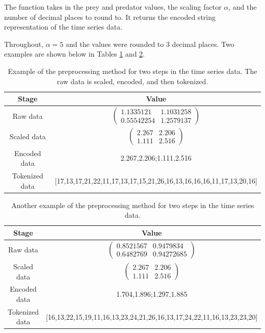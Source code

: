\documentclass[11pt,a4paper]{article}
\begin{document}
\begin{listing}[h]
\inputminted[firstline=64, lastline=83]{python}{../src/preprocessor.py}
\caption{The function takes in the prey and predator values, the scaling factor $\alpha$, and the number of decimal places to round to. It returns the encoded string representation of the time series data.}
\label{lst:preprocess}
\end{listing}

Throughout, $\alpha=5$ and the values were rounded to 3 decimal places. Two examples are shown below in Tables \ref{tab:example} and \ref{tab:example2}.

\begin{table}
    \centering
    \begin{tabular}{c|c}
        Stage & Value \\
        \hline
        Raw data & $\begin{pmatrix} 1.1335121  & 1.1031258 \\ 0.55542254  & 1.2579137 \end{pmatrix}$ \\
        Scaled data & $\begin{pmatrix} 2.267 & 2.206 \\ 1.111 & 2.516 \end{pmatrix}$ \\
        Encoded data & 2.267,2.206;1.111,2.516 \\
        Tokenized data & [17,13,17,21,22,11,17,13,17,15,21,26,16,13,16,16,16,11,17,13,20,16]
    \end{tabular}
    \caption{Example of the preprocessing method for two steps in the time series data. The raw data is scaled, encoded, and then tokenized.}
    \label{tab:example}
\end{table}

\begin{table}
    \centering
    \begin{tabular}{c|c}
        Stage & Value \\
        \hline
        Raw data & $\begin{pmatrix} 0.8521567 & 0.9479834   \\ 0.6482769  & 0.94272685  \end{pmatrix}$ \\
        Scaled data & $\begin{pmatrix} 2.267 & 2.206 \\ 1.111 & 2.516 \end{pmatrix}$ \\
        Encoded data & 1.704,1.896;1.297,1.885 \\
        Tokenized data & [16,13,22,15,19,11,16,13,23,24,21,26,16,13,17,24,22,11,16,13,23,23,20]
    \end{tabular}
    \caption{Another example of the preprocessing method for two steps in the time series data.}
    \label{tab:example2}
\end{table}
\clearpage
\end{document}
